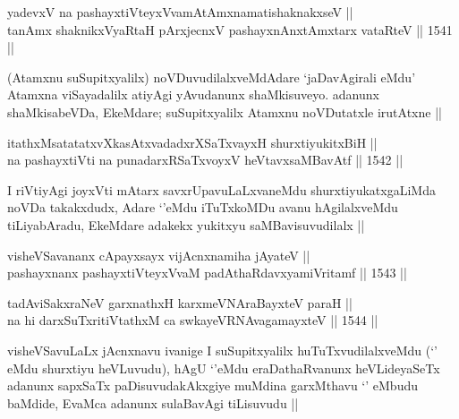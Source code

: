 \begin{shl}
yadevxV na pashayxtiVteyxVvamAtAmxnamatishaknakxseV || \\
tanAmx shaknikxVyaRtaH pArxjecnxV pashayxnAnxtAmx\s tarx vataRteV ||  1541 ||  
\end{shl}

\begin{artha}
(Atamxnu suSupitxyalilx) noVDuvudilalxveMdAdare `jaDavAgirali eMdu' Atamxna viSayadalilx atiyAgi yAvudanunx shaMkisuveyo. adanunx shaMkisabeVDa, EkeMdare; suSupitxyalilx Atamxnu noVDutatxle irutAtxne ||
\end{artha}


\begin{shl}
itathxMsatatatxvXkasAtxvadadxrXSaTxvayxH shurxtiyukitxBiH || \\
na pashayxtiVti na punadarxRSaTxvoyxV heVtavxsaMBavAtf ||  1542 ||  
\end{shl}

\begin{artha}
I riVtiyAgi joyxVti mAtarx savxrUpavuLaLxvaneMdu shurxtiyukatxgaLiMda noVDa takakxdudx, Adare `\stext'eMdu iTuTxkoMDu avanu hAgilalxveMdu tiLiyabAradu, EkeMdare adakekx yukitxyu saMBavisuvudilalx ||
\end{artha}



\begin{shl}
visheVSavananx cApayxsayx vijAcnxnamiha jAyateV || \\
pashayxnanx pashayxtiVteyxVvaM padAthaRdavxyamiVritamf ||  1543 ||  
\end{shl}
				
\begin{shl}
tadAviSakxraNeV garxnathxH karxmeVNA\s \s raBayxteV paraH || \\
na hi darxSuTxritiVtathxM ca swkayeVRNAvagamayxteV ||  1544 ||  
\end{shl}

\begin{artha}
visheVSavuLaLx jAcnxnavu ivanige I suSupitxyalilx huTuTxvudilalxveMdu (`\stext' eMdu shurxtiyu heVLuvudu), hAgU `\stext'eMdu eraDathaRvanunx heVLideyaSeTx adanunx sapxSaTx paDisuvudakAkxgiye muMdina garxMthavu `\stext' eMbudu baMdide, EvaMca adanunx sulaBavAgi tiLisuvudu ||
\end{artha}


